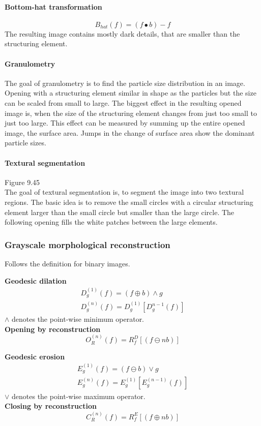 \paragraph{Bottom-hat transformation}
\[
	B_{hat}(f) = (f \bullet b)-f
\]
The resulting image contains mostly dark details, that are smaller than the structuring element.
\paragraph{Granulometry}
The goal of granulometry is to find the particle size distribution in an image. Opening with a structuring element similar in shape as the particles but the size can be scaled from small to large. The biggest effect in the resulting opened image is, when the size of the structuring element changes from just too small to just too large. This effect can be measured by summing up the entire opened image, the surface area. Jumps in the change of surface area show the dominant particle sizes.
\paragraph{Textural segmentation}
Figure 9.45\\
The goal of textural segmentation is, to segment the image into two textural regions. The basic idea is to remove the small circles with a circular structuring element larger than the small circle but smaller than the large circle. The following opening fills the white patches between the large elements.
\subsubsection{Grayscale morphological reconstruction}
Follows the definition for binary images.\\

\begin{multicols}{2}
\textbf{Geodesic dilation}
\begin{align*}
	D_g^{(1)}(f) = (f\oplus b)\wedge g\\
	D_g^{(n)}(f) = D_g^{(1)}[D_g^{n-1}(f)]
\end{align*}
$\wedge$ denotes the point-wise minimum operator. \\

\textbf{Opening by reconstruction}
	\[
		O_R^{(n)} (f) = R_f^D \left[ (f \ominus nb) \right]
	\]

\textbf{Geodesic erosion}
\begin{align*}
	E_g^{(1)}(f) = (f\ominus b)\vee g\\
	E_g^{(n)}(f) = E_g^{(1)}[E_g^{(n-1)}(f)]
\end{align*}
$\vee$ denotes the point-wise maximum operator. \\

\textbf{Closing by reconstruction}
	\[
		C_R^{(n)} (f) = R_f^E \left[ (f \oplus nb) \right]
	\]
\end{multicols}
